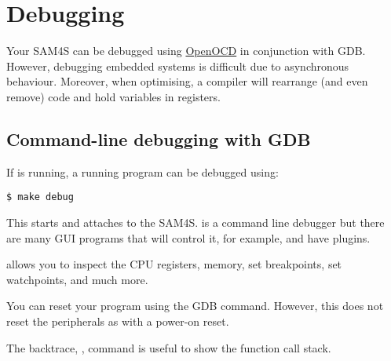 \chapter{Debugging}
\label{debugging}

Your SAM4S can be debugged using \hyperref[OpenOCD]{OpenOCD} in
conjunction with GDB.  However, debugging embedded systems is
difficult due to asynchronous behaviour.  Moreover, when optimising, a
compiler will rearrange (and even remove) code and hold variables in
registers.

\section{Command-line debugging with GDB}

If  is running, a running program can be debugged using:

\begin{verbatim}
$ make debug
\end{verbatim}

This starts  and attaches to the SAM4S.  is
a command line debugger but there are many GUI programs that will
control it, for example,  and  have
plugins.

 allows you to inspect the CPU registers, memory, set
breakpoints, set watchpoints, and much more.

You can reset your program using the GDB  command.
However, this does not reset the peripherals as with a power-on reset.

The backtrace, , command is useful to show the function call
stack.


